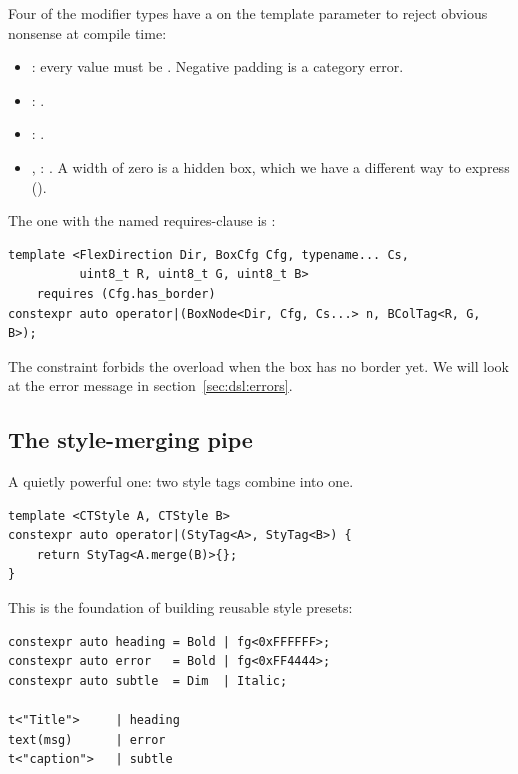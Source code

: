 Four of the modifier types have a  on the
template parameter to reject obvious nonsense at compile time:

\begin{itemize}[leftmargin=*]
  \item {}: every value must be . Negative
    padding is a category error.
  \item {}: .
  \item {}: .
  \item {}, : . A width of
    zero is a hidden box, which we have a different way to express
    ().
\end{itemize}

The one with the named requires-clause is :

\begin{lstlisting}
template <FlexDirection Dir, BoxCfg Cfg, typename... Cs,
          uint8_t R, uint8_t G, uint8_t B>
    requires (Cfg.has_border)
constexpr auto operator|(BoxNode<Dir, Cfg, Cs...> n, BColTag<R, G, B>);
\end{lstlisting}

The constraint  forbids the
overload when the box has no border yet. We will look at the error
message in section~\ref{sec:dsl:errors}.

\subsection{The style-merging pipe}

A quietly powerful one: two style tags combine into one.

\begin{lstlisting}
template <CTStyle A, CTStyle B>
constexpr auto operator|(StyTag<A>, StyTag<B>) {
    return StyTag<A.merge(B)>{};
}
\end{lstlisting}

This is the foundation of building reusable style presets:

\begin{lstlisting}
constexpr auto heading = Bold | fg<0xFFFFFF>;
constexpr auto error   = Bold | fg<0xFF4444>;
constexpr auto subtle  = Dim  | Italic;

t<"Title">     | heading
text(msg)      | error
t<"caption">   | subtle
\end{lstlisting}

